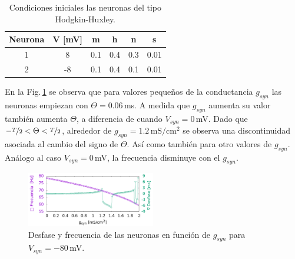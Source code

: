 \begin{table}[H]
    \centering
    \begin{tabular}{c| c| c |c |c|c}
    Neurona & V [mV] & m    & h     & n     & s     \\ \hline
    1       & 8      & 0.1  & 0.4   & 0.3   & 0.01   \\ \hline
    2       & -8     & 0.1  & 0.4   & 0.1   & 0.01  \\
   \end{tabular}
    \caption{Condiciones iniciales las neuronas del tipo Hodgkin-Huxley.}  
    \label{tab:ini_in} 
    \end{table}
   En la Fig.\,\ref{fig:des_fre_in} se observa que para valores pequeños de la conductancia $g_{syn}$ las neuronas empiezan con $\Theta= 0.06\,$ms. A medida que $g_{syn}$ aumenta su valor también aumenta $\Theta$, a diferencia de cuando $V_{syn}=0\,$mV. Dado que $-\nicefrac{T}{2}<\Theta < \nicefrac{T}{2}$, alrededor de $g_{syn}=1.2\,\text{mS}/\text{cm}^2$ se observa una discontinuidad asociada al cambio del signo de $\Theta$. Así como también para otro valores de $g_{syn}$. Análogo al caso $V_{syn}=0\,$mV, la frecuencia disminuye con el $g_{syn}$.

   \begin{figure}[H]
            \centering
            \includegraphics[width=0.5\textwidth]{current_15_in.png}
            \caption{Desfase y frecuencia de las neuronas en función de $g_{syn}$ para $V_{syn}=-80\,$mV.}
            \label{fig:des_fre_in}
        \end{figure}

